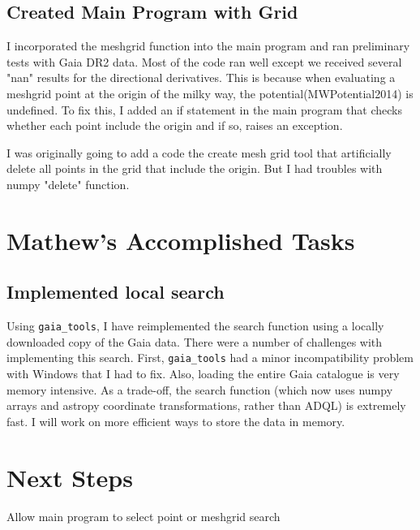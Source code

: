 \documentclass[12pt]{article}
\begin{document}
\subsection{Created Main Program with Grid}
I incorporated the meshgrid function into the main program and ran preliminary tests with Gaia DR2 data. Most of the code ran well except we received several "nan" results for the directional derivatives. This is because when evaluating a meshgrid point at the origin of the milky way, the potential(MWPotential2014) is undefined. To fix this, I added an if statement in the main program that checks whether each point include the origin and if so, raises an exception.

I was originally going to add a code the create mesh grid tool that artificially delete all points in the grid that include the origin. But I had troubles with numpy "delete" function.

\section{Mathew's Accomplished Tasks}
\subsection{Implemented local search}
Using \texttt{gaia\_tools}, I have reimplemented the search function using a locally downloaded copy of the Gaia data. There were a number of challenges with implementing this search. First, \texttt{gaia\_tools} had a minor incompatibility problem with Windows that I had to fix. Also, loading the entire Gaia catalogue is very memory intensive. As a trade-off, the search function (which now uses numpy arrays and astropy coordinate transformations, rather than ADQL) is extremely fast. I will work on more efficient ways to store the data in memory.

\section{Next Steps} 
Allow main program to select point or meshgrid search 
\end{document}
